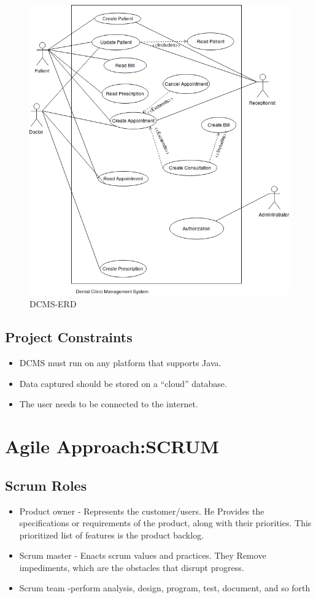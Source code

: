 \documentclass[11 pt]{article}
\begin{document}
\begin{figure}[h]
    \centering
    \includegraphics[scale = 0.5]{Use Case Diagram.png}
    \caption{DCMS-ERD}
    \label{fig:ERD}
    \end{figure}

    \subsection{Project Constraints}
    \begin{itemize}
    \item
    DCMS must run on any platform that supports Java.
    \item
    Data captured should be stored on a “cloud” database.
    \item
    The user needs to be connected to the internet.
    \end{itemize}
\section{Agile Approach:SCRUM}
\subsection{Scrum Roles}
\begin{itemize}
    \item
    Product owner - Represents the customer/users.  He Provides the specifications or requirements of the product, along with their priorities. This prioritized list of features is the product backlog.
    \item
    Scrum master - Enacts scrum values and practices. They Remove impediments, which are the obstacles that disrupt progress.
    \item
    Scrum team -perform analysis, design, program, test, document, and so forth
    \end{itemize}
\end{document}
